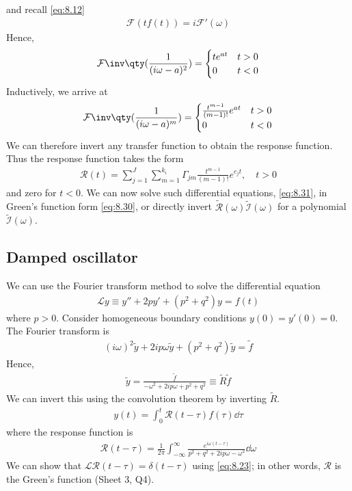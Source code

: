 and recall \cref{eq:8.12}
\begin{align*}
	\mathcal F (t f(t)) = i \mathcal F'(\omega)
\end{align*}
Hence,
\begin{align*}
	\mathcal F\inv\qty(\frac{1}{(i \omega - a)^2}) = \begin{cases}
		t e^{at} & t > 0 \\
		0        & t < 0
	\end{cases}
\end{align*}
Inductively, we arrive at
\begin{align} \label{eq:8.34}
	\mathcal F\inv\qty(\frac{1}{(i \omega - a)^m}) = \begin{cases}
		\frac{t^{m-1}}{(m-1)!} e^{at} & t > 0 \\
		0                             & t < 0
	\end{cases}
\end{align}
We can therefore invert any transfer function to obtain the response function.
Thus the response function takes the form
\begin{align} \label{eq:8.35}
	\mathcal R(t) = \sum_{j=1}^J \sum_{m=1}^{k_i} \Gamma_{jm} \frac{t^{m-1}}{(m-1)!} e^{c_j t},\quad t > 0
\end{align}
and zero for $t < 0$.
We can now solve such differential equations, \cref{eq:8.31}, in Green's function form \cref{eq:8.30}, or directly invert $\widetilde{\mathcal R}(\omega) \widetilde{\mathcal I}(\omega)$ for a polynomial $\widetilde{\mathcal I}(\omega)$.

\subsection{Damped oscillator}
We can use the Fourier transform method to solve the differential equation
\begin{align*}
	\mathcal L y \equiv y'' + 2py' + (p^2 + q^2)y = f(t)
\end{align*}
where $p > 0$.
Consider homogeneous boundary conditions $y(0) = y'(0) = 0$.
The Fourier transform is
\begin{align*}
	(i\omega)^2 \widetilde y + 2 i p \omega \widetilde y + (p^2 + q^2) \widetilde y = \widetilde f
\end{align*}
Hence,
\begin{align*}
	\widetilde y = \frac{\widetilde f}{-\omega^2 + 2ip\omega + p^2 + q^2} \equiv \widetilde R \widetilde f
\end{align*}
We can invert this using the convolution theorem by inverting $\widetilde R$.
\begin{align*}
	y(t) = \int_0^t \mathcal R(t-\tau) f(\tau) \dd{\tau}
\end{align*}
where the response function is
\begin{align*}
	\mathcal R(t - \tau) = \frac{1}{2\pi} \int_{-\infty}^\infty \frac{e^{i\omega(t-\tau)}}{p^2 + q^2 + 2ip\omega - \omega^2} \dd{\omega}
\end{align*}
We can show that $\mathcal L \mathcal R(t-\tau) = \delta(t-\tau)$ using \cref{eq:8.23}; in other words, $\mathcal R$ is the Green's function (Sheet 3, Q4).

